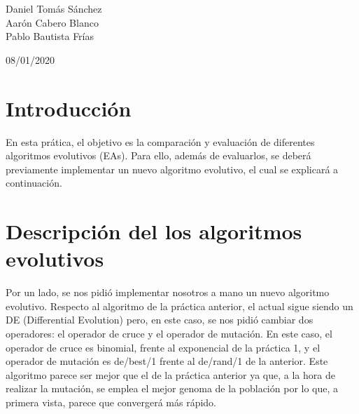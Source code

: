 \documentclass[11pt, a4paper, titlepage]{article}
\begin{document}
	\begin{titlepage}
    	\begin{center}
        	\hrulefill

        	\vspace{0.5cm}
        	{\bf\fontsize{25}{0}{\selectfont{Optimización Heurística\\[0.5cm]}}}
        	\fontsize{15}{0}{\selectfont{Evaluación de EAs\\[0.5cm]}}
        	\hrulefill
        	\vspace{6.0cm}
    	\end{center}

    	\centering
    	{\Large Daniel Tomás Sánchez\\ Aarón Cabero Blanco \\ Pablo Bautista 				Frías \par}
    	\vspace{2cm}
    	{\Large 08/01/2020 \par}
	\end{titlepage}

\newpage


\tableofcontents

\newpage

\section{Introducción}
En esta prática, el objetivo es la comparación y evaluación de diferentes algoritmos evolutivos (EAs). Para ello, además de evaluarlos, se deberá previamente  implementar un nuevo algoritmo evolutivo, el cual se explicará a continuación.
\section{Descripción del los algoritmos evolutivos}
Por un lado, se nos pidió implementar nosotros a mano un nuevo algoritmo evolutivo. Respecto al algoritmo de la práctica anterior, el actual sigue siendo un DE (Differential Evolution) pero, en este caso, se nos pidió cambiar dos operadores: el operador de cruce y el operador de mutación. En este caso, el operador de cruce es binomial, frente al exponencial de la práctica 1, y el operador de mutación es de/best/1 frente al de/rand/1 de la anterior. Este algoritmo parece ser mejor que el de la práctica anterior ya que, a la hora de realizar la mutación, se emplea el mejor genoma de la población por lo que, a primera vista, parece que convergerá más rápido.
\end{document}
